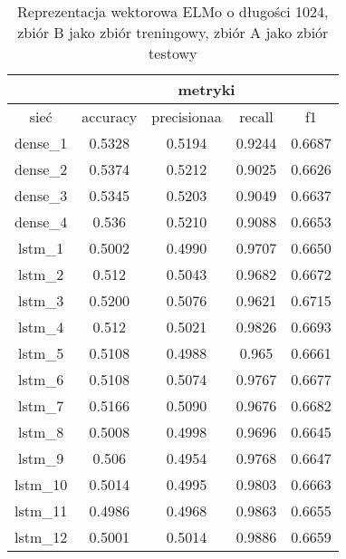 \begin{table}[] \centering
    \caption{Reprezentacja wektorowa ELMo o długości 1024, zbiór B jako zbiór treningowy, zbiór A jako zbiór testowy }
    \label{tab:wyniki_1024_eks2}
    \begin{tabular}{|c|c|c|c|c|}
        \hline
                 & \multicolumn{4}{c|}{metryki}                                 \\ \hline
        sieć     & accuracy                     & precisionaa & recall & f1     \\ \hline
        dense\_1 & 0.5328                       & 0.5194      & 0.9244 & 0.6687 \\ \hline
        dense\_2 & 0.5374                       & 0.5212      & 0.9025 & 0.6626 \\ \hline
        dense\_3 & 0.5345                       & 0.5203      & 0.9049 & 0.6637 \\ \hline
        dense\_4 & 0.536                        & 0.5210      & 0.9088 & 0.6653 \\ \hline
        lstm\_1  & 0.5002                       & 0.4990      & 0.9707 & 0.6650 \\ \hline
        lstm\_2  & 0.512                        & 0.5043      & 0.9682 & 0.6672 \\ \hline
        lstm\_3  & 0.5200                       & 0.5076      & 0.9621 & 0.6715 \\ \hline
        lstm\_4  & 0.512                        & 0.5021      & 0.9826 & 0.6693 \\ \hline
        lstm\_5  & 0.5108                       & 0.4988      & 0.965  & 0.6661 \\ \hline
        lstm\_6  & 0.5108                       & 0.5074      & 0.9767 & 0.6677 \\ \hline
        lstm\_7  & 0.5166                       & 0.5090      & 0.9676 & 0.6682 \\ \hline
        lstm\_8  & 0.5008                       & 0.4998      & 0.9696 & 0.6645 \\ \hline
        lstm\_9  & 0.506                        & 0.4954      & 0.9768 & 0.6647 \\ \hline
        lstm\_10 & 0.5014                       & 0.4995      & 0.9803 & 0.6663 \\ \hline
        lstm\_11 & 0.4986                       & 0.4968      & 0.9863 & 0.6655 \\ \hline
        lstm\_12 & 0.5001                       & 0.5014      & 0.9886 & 0.6659 \\ \hline

\end{tabular}
\end{table}
